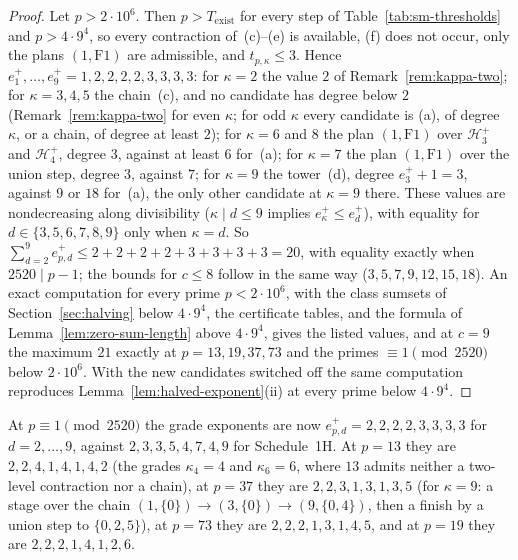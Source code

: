 \begin{proof}
Let $p > 2\cdot10^6$. Then $p > T_{\mathrm{exist}}$ for every step of Table~\ref{tab:sm-thresholds} and $p > 4\cdot9^4$, so every contraction of~(c)--(e) is available, (f) does not occur, only the plans $(1,\mathrm{F1})$ are admissible, and $t_{p,\kappa} \le 3$. Hence $e^+_1,\dots,e^+_9 = 1, 2, 2, 2, 2, 3, 3, 3, 3$: for $\kappa = 2$ the value $2$ of Remark~\ref{rem:kappa-two}; for $\kappa = 3,4,5$ the chain~(c), and no candidate has degree below $2$ (Remark~\ref{rem:kappa-two} for even $\kappa$; for odd $\kappa$ every candidate is (a), of degree $\kappa$, or a chain, of degree at least $2$); for $\kappa = 6$ and $8$ the plan $(1,\mathrm{F1})$ over $\mathcal H^+_3$ and $\mathcal H^+_4$, degree $3$, against at least $6$ for~(a); for $\kappa = 7$ the plan $(1,\mathrm{F1})$ over the union step, degree $3$, against $7$; for $\kappa = 9$ the tower~(d), degree $e^+_3 + 1 = 3$, against $9$ or $18$ for~(a), the only other candidate at $\kappa = 9$ there. These values are nondecreasing along divisibility ($\kappa \mid d \le 9$ implies $e^+_\kappa \le e^+_d$), with equality for $d \in \{3,5,6,7,8,9\}$ only when $\kappa = d$. So $\sum_{d=2}^9e^+_{p,d} \le 2+2+2+2+3+3+3+3 = 20$, with equality exactly when $2520 \mid p-1$; the bounds for $c \le 8$ follow in the same way ($3,5,7,9,12,15,18$). An exact computation for every prime $p < 2\cdot10^6$, with the class sumsets of Section~\ref{sec:halving} below $4\cdot 9^4$, the certificate tables, and the formula of Lemma~\ref{lem:zero-sum-length} above $4\cdot9^4$, gives the listed values, and at $c = 9$ the maximum $21$ exactly at $p = 13, 19, 37, 73$ and the primes $\equiv 1 \pmod{2520}$ below $2\cdot10^6$. With the new candidates switched off the same computation reproduces Lemma~\ref{lem:halved-exponent}(ii) at every prime below $4\cdot9^4$.
\end{proof}

At $p \equiv 1 \pmod{2520}$ the grade exponents are now $e^+_{p,d} = 2,2,2,2,3,3,3,3$ for $d = 2,\dots,9$, against $2,3,3,5,4,7,4,9$ for Schedule~1H. At $p = 13$ they are $2,2,4,1,4,1,4,2$ (the grades $\kappa_4 = 4$ and $\kappa_6 = 6$, where $13$ admits neither a two-level contraction nor a chain), at $p = 37$ they are $2,2,3,1,3,1,3,5$ (for $\kappa = 9$: a stage over the chain $(1,\{0\})\to(3,\{0\})\to(9,\{0,4\})$, then a finish by a union step to $\{0,2,5\}$), at $p = 73$ they are $2,2,2,1,3,1,4,5$, and at $p = 19$ they are $2,2,2,1,4,1,2,6$.
